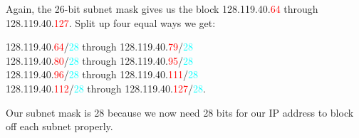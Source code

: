 \documentclass{article}
\begin{document}
\begin{enumerate}
Again, the 26-bit subnet mask gives us the block 128.119.40.\textcolor{Red}{64} through 128.119.40.\textcolor{Red}{127}. Split up four equal ways we get:\par
128.119.40.\textcolor{Red}{64}/\textcolor{Cyan}{28} through 128.119.40.\textcolor{Red}{79}/\textcolor{Cyan}{28}\\
128.119.40.\textcolor{Red}{80}/\textcolor{Cyan}{28} through 128.119.40.\textcolor{Red}{95}/\textcolor{Cyan}{28}\\
128.119.40.\textcolor{Red}{96}/\textcolor{Cyan}{28} through 128.119.40.\textcolor{Red}{111}/\textcolor{Cyan}{28}\\
128.119.40.\textcolor{Red}{112}/\textcolor{Cyan}{28} through 128.119.40.\textcolor{Red}{127}/\textcolor{Cyan}{28}.\par
Our subnet mask is 28 because we now need 28 bits for our IP address to block off each subnet properly.

\end{enumerate}
\end{document}
